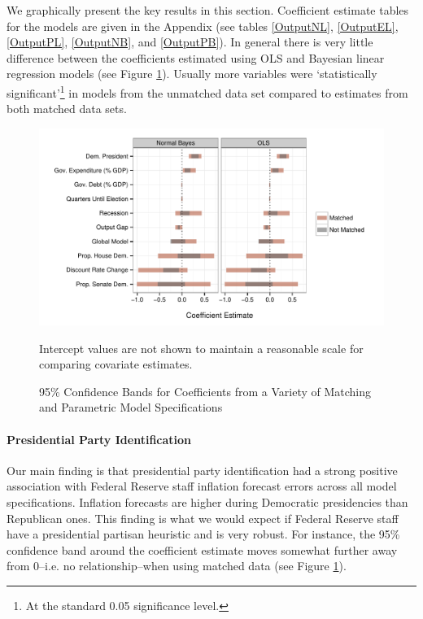 \documentclass[a4paper]{article}\usepackage{graphicx, color}
\newenvironment{knitrout}{}{} %
\begin{document}
We graphically present the key results in this section. Coefficient estimate tables for the models are given in the Appendix (see tables \ref{OutputNL}, \ref{OutputEL}, \ref{OutputPL}, \ref{OutputNB}, and \ref{OutputPB}). In general there is very little difference between the coefficients estimated using OLS and Bayesian linear regression models (see Figure \ref{CoefComparePlots}). Usually more variables were `statistically significant'\footnote{At the standard 0.05 significance level.} in models from the unmatched data set compared to estimates from both matched data sets.




\begin{figure}[t]
    \caption{95\% Confidence Bands for Coefficients from a Variety of Matching and Parametric Model Specifications}
    \label{CoefComparePlots}
    \begin{center}

\begin{knitrout}
\color{fgcolor}\includegraphics[width=0.95\linewidth]{figure/CoefComparePlots} 
\end{knitrout}

    \end{center}
    \begin{singlespace}
        {\scriptsize{Intercept values are not shown to maintain a reasonable scale for comparing covariate estimates.}}
    \end{singlespace}
\end{figure}

\paragraph{Presidential Party Identification}

Our main finding is that presidential party identification had a strong positive association with Federal Reserve staff inflation forecast errors across all model specifications. Inflation forecasts are higher during Democratic presidencies than Republican ones. This finding is what we would expect if Federal Reserve staff have a presidential partisan heuristic and is very robust. For instance, the 95\% confidence band around the coefficient estimate moves somewhat further away from 0--i.e. no relationship--when using matched data (see Figure \ref{CoefComparePlots}).  
\end{document}
